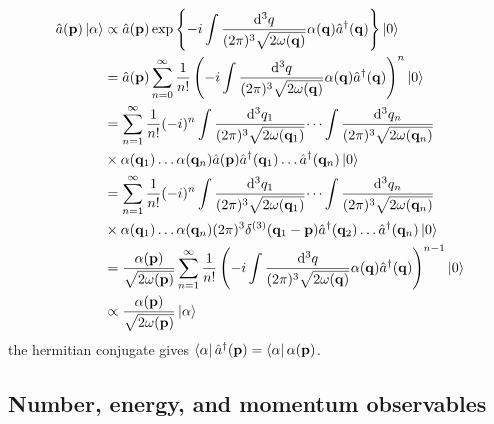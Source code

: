 \begin{equation}
	\begin{split}
		\hat{a}(\vb{p})
		\ket{\alpha}
		&\propto
		\hat{a}(\vb{p})
		\exp\left\{
			-i
			\int\frac{\dd[3]{q}}{(2\pi)^3\sqrt{2\omega(\vb{q})}}
			\alpha(\vb{q})
			\hat{a}^\dagger(\vb{q})
		\right\}
		\ket{0}
		\\
		&=
		\hat{a}(\vb{p})
		\sum_{n=0}^\infty
		\frac{1}{n!}
		\left(
			-i
			\int\frac{\dd[3]{q}}{(2\pi)^3\sqrt{2\omega(\vb{q})}}
			\alpha(\vb{q})
			\hat{a}^\dagger(\vb{q})
		\right)^n
		\ket{0}
		\\
		&=
		\sum_{n=1}^\infty
		\frac{1}{n!}
		(-i)^n
		\int\frac{\dd[3]{q_1}}{(2\pi)^3\sqrt{2\omega(\vb{q}_1)}}
		\dots
		\int\frac{\dd[3]{q_n}}{(2\pi)^3\sqrt{2\omega(\vb{q}_n)}}
		\\
		&\times
		\alpha(\vb{q}_1)
		\dots
		\alpha(\vb{q}_n)
		\hat{a}(\vb{p})
		\hat{a}^\dagger(\vb{q}_1)
		\dots
		\hat{a}^\dagger(\vb{q}_n)
		\ket{0}
		\\
		&=
		\sum_{n=1}^\infty
		\frac{1}{n!}
		(-i)^n
		\int\frac{\dd[3]{q_1}}{(2\pi)^3\sqrt{2\omega(\vb{q}_1)}}
		\dots
		\int\frac{\dd[3]{q_n}}{(2\pi)^3\sqrt{2\omega(\vb{q}_n)}}
		\\
		&\times
		\alpha(\vb{q}_1)
		\dots
		\alpha(\vb{q}_n)
		(2\pi)^3\delta^{(3)}(\vb{q}_1-\vb{p})
		\hat{a}^\dagger(\vb{q}_2)
		\dots
		\hat{a}^\dagger(\vb{q}_n)
		\ket{0}
		\\
		&=
		\frac{\alpha(\vb{p})}{\sqrt{2\omega(\vb{p})}}
		\sum_{n=1}^\infty
		\frac{1}{n!}
		\left(
			-i
			\int\frac{\dd[3]{q}}{(2\pi)^3\sqrt{2\omega(\vb{q})}}
			\alpha(\vb{q})
			\hat{a}^\dagger(\vb{q})
		\right)^{n-1}
		\ket{0}
		\\
		&\propto
		\frac{\alpha(\vb{p})}{\sqrt{2\omega(\vb{p})}}
		\ket{\alpha}
	\end{split}
\end{equation}
the hermitian conjugate gives $\bra{\alpha}\hat{a}^\dagger(\vb{p})=\bra{\alpha}\alpha(\vb{p})$.

\subsection{Number, energy, and momentum observables}

